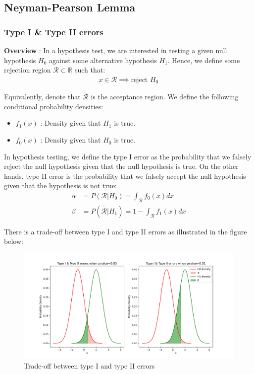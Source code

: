 \subsection{Neyman-Pearson Lemma}

\subsubsection{Type I \& Type II errors}
\textbf{Overview} : In a hypothesis test, we are interested in testing a given null hypothesis $H_0$ against some alternative hypothesis $H_1$. Hence, we define some rejection region $\mathcal{R}\subset\mathbb{R}$ such that:
\begin{align*}
    x \in \mathcal{R} \implies \text{reject } H_0 
\end{align*}

\noindent Equivalently, denote that $\overline{\mathcal{R}}$ is the acceptance region. We define the following conditional probability densities:
\begin{itemize}
    \item $f_1(x)$ : Density given that $H_1$ is true.
    \item $f_0(x)$ : Density given that $H_0$ is true.
\end{itemize}

\begin{definition}
    In hypothesis testing, we define the type I error as the probability that we falsely reject the null hypothesis given that the null hypothesis is true. On the other hands, type II error is the probability that we falsely accept the null hypothesis given that the hypothesis is not true:
    \begin{align*}
        \alpha &= P(\mathcal{R} | H_0) = \int_\mathcal{R} f_0(x)dx 
        \\ 
        \beta &= P(\overline{\mathcal{R}} | H_1) = 1 - \int_\mathcal{R} f_1(x)dx
    \end{align*}
\end{definition}

\noindent There is a trade-off between type I and type II errors as illustrated in the figure below:
\begin{figure}[ht]
    \centering
    \includegraphics[width=\textwidth]{figures/typeI_typeII_errors_tradeoff.png}
    \caption{Trade-off between type I and type II errors}
    \label{fig:type_I_type_II_errors_tradeoff}
\end{figure}

